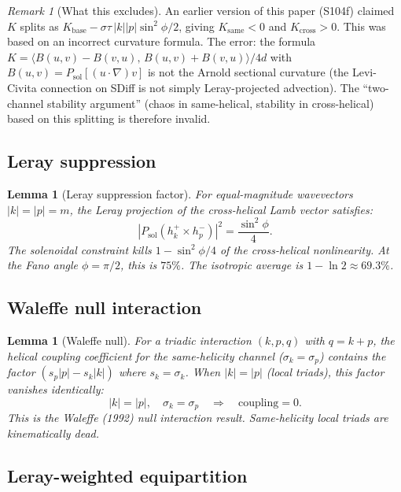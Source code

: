 \documentclass[11pt]{article}
\newtheorem{lemma}[theorem]{Lemma}
\theoremstyle{definition}
\theoremstyle{remark}
\newtheorem{remark}[theorem]{Remark}
\begin{document}
\begin{remark}[What this excludes]
An earlier version of this paper (S104f) claimed $K$ splits as
$K_{\mathrm{base}} - \sigma\tau\,|k||p|\sin^2\phi/2$, giving
$K_{\mathrm{same}} < 0$ and $K_{\mathrm{cross}} > 0$. This was based
on an incorrect curvature formula. The error: the formula
$K = \langle B(u,v)-B(v,u),\, B(u,v)+B(v,u)\rangle / 4d$ with
$B(u,v) = P_{\mathrm{sol}}[(u\cdot\nabla)v]$ is not the Arnold
sectional curvature (the Levi-Civita connection on SDiff is not
simply Leray-projected advection). The ``two-channel stability
argument'' (chaos in same-helical, stability in cross-helical) based
on this splitting is therefore invalid.
\end{remark}

\subsection{Leray suppression}

\begin{lemma}[Leray suppression factor]\label{lem:leray}
For equal-magnitude wavevectors $|k| = |p| = m$, the Leray projection
of the cross-helical Lamb vector satisfies:
\[
  |P_{\mathrm{sol}}(h_k^+ \times h_p^-)|^2 = \frac{\sin^2\phi}{4}.
\]
The solenoidal constraint kills $1 - \sin^2\phi/4$ of the
cross-helical nonlinearity. At the Fano angle $\phi = \pi/2$, this
is $75\%$. The isotropic average is $1 - \ln 2 \approx 69.3\%$.
\end{lemma}

\subsection{Waleffe null interaction}

\begin{lemma}[Waleffe null]\label{lem:waleffe}
For a triadic interaction $(k, p, q)$ with $q = k + p$, the helical
coupling coefficient for the same-helicity channel
($\sigma_k = \sigma_p$) contains the factor
$(s_p|p| - s_k|k|)$ where $s_k = \sigma_k$. When $|k| = |p|$
(local triads), this factor vanishes identically:
\[
  |k| = |p|, \quad \sigma_k = \sigma_p
  \quad \Longrightarrow \quad
  \text{coupling} = 0.
\]
This is the Waleffe (1992) null interaction result. Same-helicity
local triads are kinematically dead.
\end{lemma}

\subsection{Leray-weighted equipartition}
\end{document}
